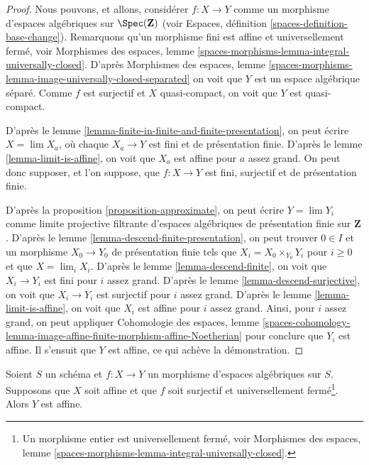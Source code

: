 \begin{proof}
Nous pouvons, et allons, considérer $f : X \to Y$ comme un morphisme d'espaces algébriques sur
$\Spec(\mathbf{Z})$ (voir
Espaces, définition \ref{spaces-definition-base-change}).
Remarquons qu'un morphisme fini est affine et universellement fermé, voir
Morphismes des espaces, lemme
\ref{spaces-morphisms-lemma-integral-universally-closed}.
D'après Morphismes des espaces, lemme
\ref{spaces-morphisms-lemma-image-universally-closed-separated}
on voit que $Y$ est un espace algébrique séparé.
Comme $f$ est surjectif et $X$ quasi-compact, on voit que $Y$ est
quasi-compact.

\medskip\noindent
D'après le lemme \ref{lemma-finite-in-finite-and-finite-presentation},
on peut écrire $X = \lim X_a$, où chaque $X_a \to Y$ est fini et de
présentation finie. D'après le
lemme \ref{lemma-limit-is-affine},
on voit que $X_a$ est affine pour $a$ assez grand.
On peut donc supposer, et l'on suppose, que $f : X \to Y$ est fini, surjectif et
de présentation finie.

\medskip\noindent
D'après la proposition \ref{proposition-approximate}, on peut écrire
$Y = \lim Y_i$ comme limite projective filtrante d'espaces
algébriques de présentation finie sur $\mathbf{Z}$.
D'après le lemme \ref{lemma-descend-finite-presentation}, on peut
trouver $0 \in I$ et un morphisme $X_0 \to Y_0$ de présentation finie
tels que $X_i = X_0 \times_{Y_0} Y_i$ pour $i \geq 0$
et que $X = \lim_i X_i$. D'après le
lemme \ref{lemma-descend-finite},
on voit que $X_i \to Y_i$ est fini pour $i$ assez grand.
D'après le lemme \ref{lemma-descend-surjective},
on voit que $X_i \to Y_i$ est surjectif pour $i$ assez grand.
D'après le lemme \ref{lemma-limit-is-affine}, on voit que $X_i$ est
affine pour $i$ assez grand. Ainsi, pour $i$ assez grand, on peut appliquer
Cohomologie des espaces, lemme
\ref{spaces-cohomology-lemma-image-affine-finite-morphism-affine-Noetherian}
pour conclure que $Y_i$ est affine. Il s'ensuit que $Y$ est affine, ce qui
achève la démonstration.
\end{proof}

\begin{proposition}
\label{proposition-affine}
Soient $S$ un schéma et $f : X \to Y$ un morphisme d'espaces algébriques
sur $S$. Supposons que $X$ soit affine et que $f$ soit surjectif et universellement
fermé\footnote{Un morphisme entier est universellement fermé, voir
Morphismes des espaces, lemme
\ref{spaces-morphisms-lemma-integral-universally-closed}.}. Alors $Y$ est affine.
\end{proposition}

